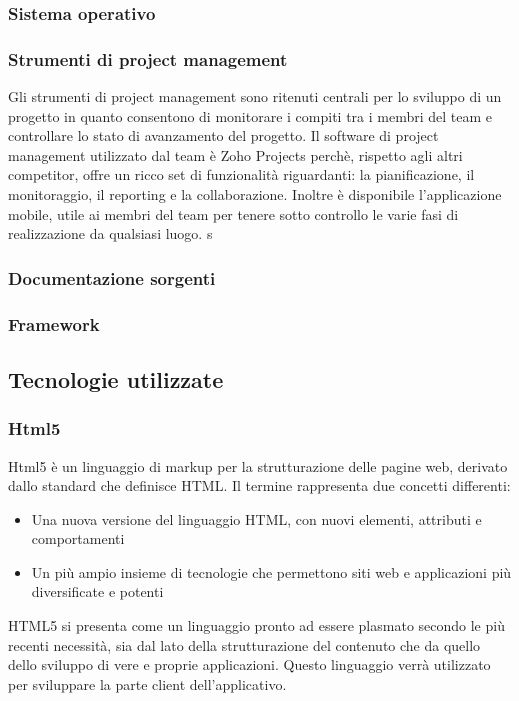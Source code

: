 \subsubsection{Sistema operativo}

\subsubsection{Strumenti di project management}
Gli strumenti di project management sono ritenuti centrali per lo sviluppo di un progetto in quanto consentono di monitorare i compiti tra i membri del team e controllare lo stato di avanzamento del progetto.
Il software di project management utilizzato dal team è Zoho Projects perchè, rispetto agli altri competitor, offre un ricco set di funzionalità riguardanti: la pianificazione, il monitoraggio, il reporting e la collaborazione.
Inoltre è disponibile l'applicazione mobile, utile ai membri del team per tenere sotto controllo le varie fasi di realizzazione da qualsiasi luogo.
  s 
\subsubsection{Documentazione sorgenti}

\subsubsection{Framework}

\subsection{Tecnologie utilizzate}
\subsubsection{Html5}
Html5 è un linguaggio di markup per la strutturazione delle pagine web, derivato dallo standard che definisce HTML.
Il termine rappresenta due concetti differenti:
\begin{itemize}
		\item
			Una nuova versione del linguaggio HTML, con nuovi elementi, attributi e comportamenti
		\item
			Un più ampio insieme di tecnologie che permettono siti web e applicazioni più diversificate e potenti
\end{itemize}
HTML5 si presenta come un linguaggio pronto ad essere plasmato secondo le più recenti necessità, sia dal lato della strutturazione del contenuto che da quello dello sviluppo di vere e proprie applicazioni.
Questo linguaggio verrà utilizzato per sviluppare la parte client dell'applicativo.

